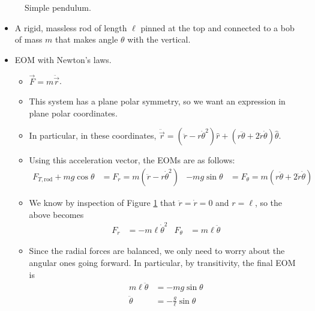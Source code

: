 \documentclass[../notes.tex]{subfiles}
\begin{document}
\begin{itemize}
\begin{figure}[h!]
        \caption{Simple pendulum.}
        \label{fig:simplePendulum}
    \end{figure}
    \begin{itemize}
        \item A rigid, massless rod of length $\ell$ pinned at the top and connected to a bob of mass $m$ that makes angle $\theta$ with the vertical.
        \item EOM with Newton's laws.
        \begin{itemize}
            \item $\vec{F}=m\ddot{\vec{r}}$.
            \item This system has a plane polar symmetry, so we want an expression in plane polar coordinates.
            \item In particular, in these coordinates, $\ddot{\vec{r}}=(\ddot{r}-r\dot{\theta}^2)\hat{r}+(r\ddot{\theta}+2\dot{r}\dot{\theta})\hat{\theta}$.
            \item Using this acceleration vector, the EOMs are as follows:
            \begin{align*}
                F_{T,\text{rod}}+mg\cos\theta &= F_r = m(\ddot{r}-r\dot{\theta}^2)&
                -mg\sin\theta &= F_\theta = m(r\ddot{\theta}+2\dot{r}\dot{\theta})
            \end{align*}
            \item We know by inspection of Figure \ref{fig:simplePendulum} that $\ddot{r}=\dot{r}=0$ and $r=\ell$, so the above becomes
            \begin{align*}
                F_r &= -m\ell\dot{\theta}^2&
                F_\theta &= m\ell\ddot{\theta}
            \end{align*}
            \item Since the radial forces are balanced, we only need to worry about the angular ones going forward. In particular, by transitivity, the final EOM is
            \begin{align*}
                m\ell\ddot{\theta} &= -mg\sin\theta\\
                \ddot{\theta} &= -\frac{g}{\ell}\sin\theta

\end{align*}
\end{itemize}
\end{itemize}
\end{itemize}
\end{document}
